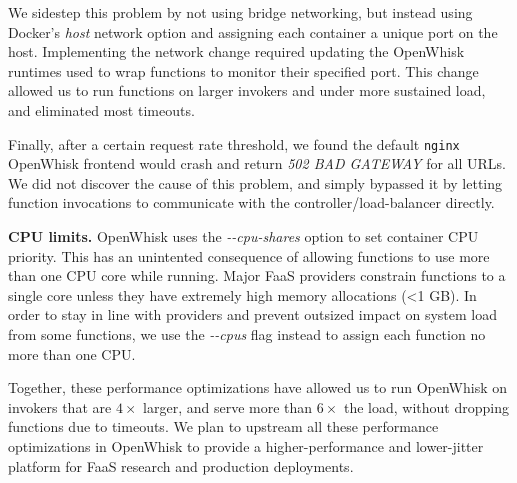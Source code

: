 We sidestep this problem by not using bridge networking, but instead using Docker's \textit{host} network option and assigning each container a unique port on the host. 
Implementing the network change required updating the OpenWhisk runtimes used to wrap functions to monitor their specified port.
This change allowed us to run functions on larger invokers and under more sustained load, and eliminated most timeouts. 

Finally, after a certain request rate threshold, we found the default \texttt{nginx} OpenWhisk frontend would crash and return \textit{502 BAD GATEWAY} for all URLs. 
We did not discover the cause of this problem, and simply bypassed it by letting function invocations to communicate with the controller/load-balancer directly. 

\noindent \textbf{CPU limits.} 
OpenWhisk uses the \textit{-{}-cpu-shares} option to set container CPU priority.
This has an unintented consequence of allowing functions to use more than one CPU core while running.
Major FaaS providers constrain functions to a single core unless they have extremely high memory allocations (<1 GB).
In order to stay in line with providers and prevent outsized impact on system load from some functions, we use the \textit{-{}-cpus} flag instead to assign each function no more than one CPU.

Together, these performance optimizations have allowed us to run OpenWhisk on invokers that are $4\times$ larger, and serve more than $6\times$ the load, without dropping functions due to timeouts.
%
We plan to upstream all these performance optimizations in OpenWhisk to provide a higher-performance and lower-jitter platform for FaaS research and production deployments. 

